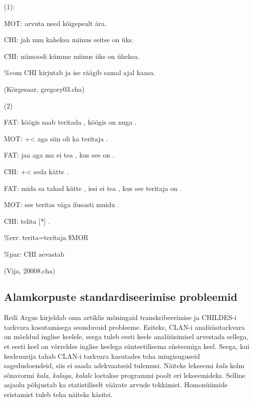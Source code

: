 \documentclass[12pt]{article}
\begin{document}
(1):
\begin{description}
    \item*MOT: arvuta need kõigepealt ära.
    \item*CHI: jah mm kaheksa miinus seitse on üks.
    \item*CHI: niimoodi kümme miinus üks on üheksa.
    \item\%com CHI kirjutab ja ise räägib samal ajal kaasa.
    \item(Kõrgesaar, gregory03.cha)
\end{description}
\hfill

(2)
\begin{description}
    \item*FAT:   köögis saab teritada , köögis on nuga .
    \item*MOT:   +< aga siin oli ka teritaja .
    \item*FAT:   jaa aga ma ei tea , kus see on .
    \item*CHI:   +< seda kätte .
    \item*FAT:   mida sa tahad kätte , issi ei tea , kus see teritaja on .
    \item*MOT:   see teritas väga ilusasti muidu .
    \item*CHI:   telita [*] .
    \item\%err:   terita=teritaja \$MOR
    \item\%par:   CHI aevastab
    \item(Vija, 20008.cha)
\end{description}


\subsection{Alamkorpuste standardiseerimise probleemid}

Reili Argus kirjeldab oma artiklis \citep{Argus2007} mõningaid transkribeerimise ja CHILDES-i tarkvara kasutamisega seonduvaid probleeme. Esiteks, CLAN-i analüüsitarkvara on mõeldud inglise keelele, seega tuleb eesti keele analüüsimisel arvestada sellega, et eesti keel on võrreldes inglise keelega sünteetilisema süsteemiga keel. Seega, kui keeleuurija tahab CLAN-i tarkvara kasutades teha mingisuguseid sagedusloendeid, siis ei saada adekvaatseid tulemusi. Näiteks lekseemi \emph{kala} kolm sõnavormi \emph{kala}, \emph{kalaga}, \emph{kalale} loetakse programmi poolt eri lekseemideks. Selline asjaolu põhjustab ka statistiliselt väärate arvude tekkimist. Homonüümide eristamist tuleb teha näiteks käsitsi.\citep[70]{Argus2007}
\end{document}
